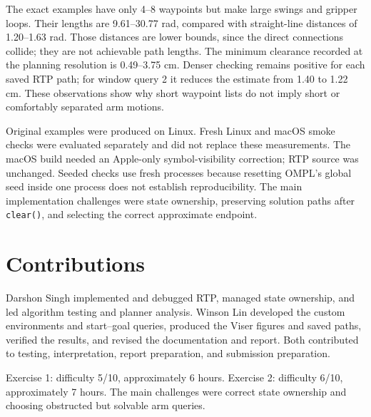 \documentclass{comp450}
\begin{document}
The exact examples have only 4--8 waypoints but make large swings and gripper loops. Their lengths are 9.61--30.77 rad, compared with straight-line distances of 1.20--1.63 rad. Those distances are lower bounds, since the direct connections collide; they are not achievable path lengths. The minimum clearance recorded at the planning resolution is 0.49--3.75 cm. Denser checking remains positive for each saved RTP path; for window query 2 it reduces the estimate from 1.40 to 1.22 cm. These observations show why short waypoint lists do not imply short or comfortably separated arm motions.

Original examples were produced on Linux. Fresh Linux and macOS smoke checks were evaluated separately and did not replace these measurements. The macOS build needed an Apple-only symbol-visibility correction; RTP source was unchanged. Seeded checks use fresh processes because resetting OMPL's global seed inside one process does not establish reproducibility. The main implementation challenges were state ownership, preserving solution paths after \texttt{clear()}, and selecting the correct approximate endpoint.

\section*{Contributions}

Darshon Singh implemented and debugged RTP, managed state ownership, and led algorithm testing and planner analysis. Winson Lin developed the custom environments and start--goal queries, produced the Viser figures and saved paths, verified the results, and revised the documentation and report. Both contributed to testing, interpretation, report preparation, and submission preparation.

Exercise 1: difficulty 5/10, approximately 6 hours. Exercise 2: difficulty 6/10, approximately 7 hours. The main challenges were correct state ownership and choosing obstructed but solvable arm queries.
\end{document}
